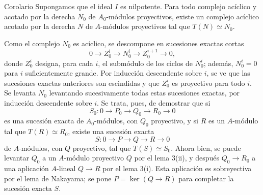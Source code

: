 \begin{statement}{Corolario}
Supongamos que el ideal $I$ es nilpotente. Para todo complejo acíclico y acotado por la derecha $N_0$ de $A_0$-módulos proyectivos, existe un complejo acíclico acotado por la derecha $N$ de $A$-módulos proyectivos tal que $T(N)\simeq N_0$.
\end{statement}

Como el complejo $N_0$ es acíclico, se descompone en sucesiones exactas cortas
\[
0\longrightarrow Z_0^i\longrightarrow N_0^i\longrightarrow Z_0^{i+1}\longrightarrow0,
\]
donde $Z_0^i$ designa, para cada $i$, el submódulo de los ciclos de $N_0^i$; además, $N_0^i=0$ para $i$ suficientemente grande. Por inducción descendente sobre $i$, se ve que las sucesiones exactas anteriores son escindidas y que $Z_0^i$ es proyectivo para todo $i$. Se levanta $N_0$ levantando sucesivamente todas estas sucesiones exactas, por inducción descendente sobre $i$. Se trata, pues, de demostrar que si
\[
S_0:0\longrightarrow P_0\longrightarrow Q_0\longrightarrow R_0\longrightarrow0
\]
es una sucesión exacta de $A_0$-módulos, con $Q_0$ proyectivo, y si $R$ es un $A$-módulo tal que $T(R)\simeq R_0$, existe una sucesión exacta
\[
S:0\longrightarrow P\longrightarrow Q\longrightarrow R\longrightarrow0
\]
de $A$-módulos, con $Q$ proyectivo, tal que $T(S)\simeq S_0$. Ahora bien, se puede levantar $Q_0$ a un $A$-módulo proyectivo $Q$ por el lema 3(ii), y después $Q_0\to R_0$ a una aplicación $A$-lineal $Q\to R$ por el lema 3(i). Esta aplicación es sobreyectiva por el lema de Nakayama; se pone $P=\ker(Q\to R)$ para completar la sucesión exacta $S$.
